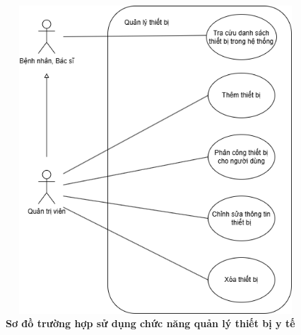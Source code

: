 \begin{figure}[H]
	\centering
	\includegraphics[width=12cm,height=11.5cm]{Images/use_case/use_case_device.png}
	\caption[Sơ đồ trường hợp sử dụng chức năng quản lý thiết bị y tế]{\bfseries \fontsize{12pt}{0pt}
		\selectfont Sơ đồ trường hợp sử dụng chức năng quản lý thiết bị y tế}
	\label{use_case_device} %
\end{figure}

